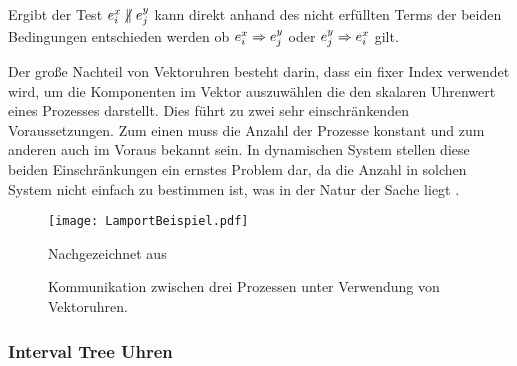 Ergibt der Test $\eix \centernot\parallel \ejy$ kann direkt anhand des nicht erfüllten Terms der beiden Bedingungen entschieden werden ob $e_i^x \Rightarrow e_j^y$ oder $e_j^y \Rightarrow e_i^x$ gilt.

Der große Nachteil von Vektoruhren besteht darin, dass ein fixer Index verwendet wird, um die Komponenten im Vektor auszuwählen die den skalaren Uhrenwert eines Prozesses darstellt.
Dies führt zu zwei sehr einschränkenden Voraussetzungen.
Zum einen muss die Anzahl der Prozesse konstant und zum anderen auch im Voraus bekannt sein.
In dynamischen System stellen diese beiden Einschränkungen ein ernstes Problem dar, da die Anzahl in solchen System nicht einfach zu bestimmen ist, was in der Natur der Sache liegt \cite{landes2006dynamic}.

\begin{figure}[ht]
    \centering
    \texttt{[image: LamportBeispiel.pdf]}
    \caption[Exemplarische Kommunikation mit Vektoruhren]{Kommunikation zwischen drei Prozessen unter Verwendung von Vektoruhren.}
    Nachgezeichnet aus  \cite{landes2006dynamic}
    \label{fig:VektorBsp}
\end{figure}


\subsubsection{Interval Tree Uhren}